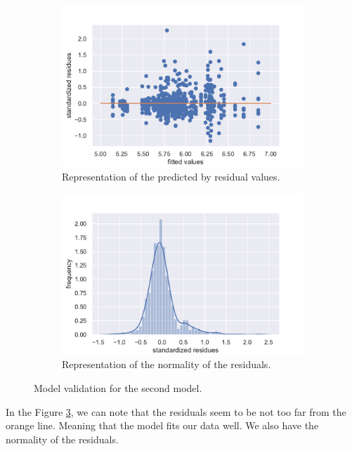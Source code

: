 \documentclass{article}
\begin{document}
\begin{figure}[H]
\centering
\begin{subfigure}{.5\textwidth}
  \centering
  \includegraphics[width=1\linewidth]{./images/homo_mod2.pdf}
  \caption{Representation of the predicted by residual values.}
  \label{fig:homo_mod2}
\end{subfigure}%
\begin{subfigure}{.5\textwidth}
  \centering
  \includegraphics[width=1\linewidth, clip,trim={0cm 0cm 0cm 0.6cm} ]{./images/resid_norm_m2.pdf}
  \caption{Representation of the normality of the residuals.}
  \label{fig:resid_}
\end{subfigure}
\caption{Model validation for the second model.}
\label{fig:valid_2}
\end{figure}

In the Figure \ref{fig:valid_2}, we can note that the residuals seem to be not too far from the orange line. Meaning that the model fits our data well.
We also have the normality of the residuals.
\end{document}
